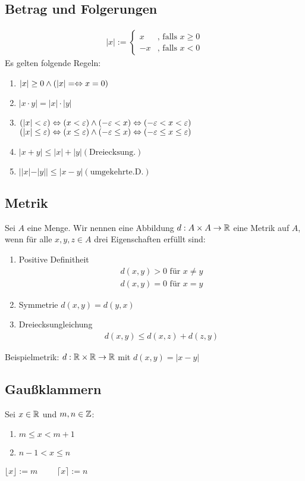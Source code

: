 \subsection*{Betrag und Folgerungen}
\begin{align*}
    |x| := \begin{cases}
    x &\text{, falls } x \geq 0\\
    -x &\text{, falls } x < 0
    \end{cases}
\end{align*}
Es gelten folgende Regeln:
\begin{enumerate}[label=\alph*., noitemsep]
    \item $|x| \geq 0 \land (|x| = \Leftrightarrow x = 0)$
    \item $|x \cdot y| = |x| \cdot |y|$
    \item $(|x| < \varepsilon) \Leftrightarrow (x < \varepsilon) \land (-\varepsilon < x) \Leftrightarrow (-\varepsilon < x < \varepsilon)$\\
          $(|x| \leq \varepsilon) \Leftrightarrow (x \leq \varepsilon) \land (-\varepsilon \leq x) \Leftrightarrow (-\varepsilon \leq x \leq \varepsilon)$
    \item $|x + y| \leq |x| + |y| (\text{Dreiecksung.})$
    \item $||x| - |y|| \leq |x - y| (\text{umgekehrte.D.})$
\end{enumerate}
\subsection*{Metrik}
Sei $A$ eine Menge. Wir nennen eine Abbildung $d:A \times A \rightarrow \mathbb R$ eine Metrik auf $A$, wenn für alle $x, y, z \in A$ drei Eigenschaften erfüllt sind:
\begin{enumerate}[label=\alph*., noitemsep]
    \item Positive Definitheit
    \begin{align*}
        d(x, y) > 0 \text{ für } x \neq y\\
        d(x, y) = 0 \text{ für } x = y
    \end{align*}
    \item Symmetrie $d(x, y) = d(y, x)$
    \item Dreiecksungleichung
    \begin{align*}
        d(x, y) \leq d(x, z) + d(z, y)
    \end{align*}
\end{enumerate}
Beispielmetrik: $d:\mathbb R \times \mathbb R \rightarrow \mathbb R$ mit $d(x, y) = |x - y|$
\subsection*{Gaußklammern}
Sei $x \in \mathbb R$ und $m, n \in \mathbb Z$:
\begin{enumerate}[label=\alph*), noitemsep]
    \item $m \leq x < m+1$
    \item $n - 1 < x \leq n$
\end{enumerate}
$\lfloor x \rfloor := m\quad\quad$ $\lceil x \rceil := n$
